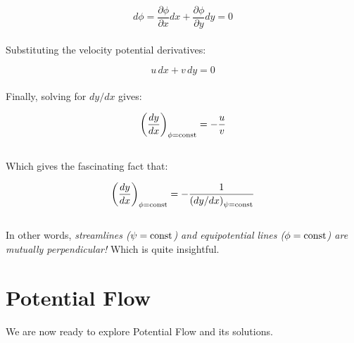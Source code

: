 \documentclass[11pt]{article}
\begin{document}
\begin{equation*}
    d\phi = \frac{\partial \phi}{\partial x}dx + \frac{\partial \phi}{\partial y}dy = 0
\end{equation*} \\ 
\noindent
Substituting the velocity potential derivatives:

\begin{equation*}
    u\,dx + v\,dy = 0
\end{equation*}\\
\noindent
Finally, solving for $dy/dx$ gives:

\begin{equation*}
    \left( \frac{dy}{dx} \right)_{\phi = \textnormal{const}}=-\frac{u}{v}
\end{equation*}\\
Which gives the fascinating fact that:

\begin{equation*}
    \left( \frac{dy}{dx} \right)_{\phi = \textnormal{const}} = -\frac{1}{\left( dy/dx \right)_{\psi=\textnormal{const}}}
\end{equation*}\\
\noindent
In other words, \emph{streamlines ($\psi = \textnormal{const}$) and equipotential lines ($\phi = \textnormal{const}$) are mutually perpendicular!} Which is quite insightful.
\pagebreak

\section{Potential Flow}
We are now ready to explore Potential Flow and its solutions.
\end{document}
